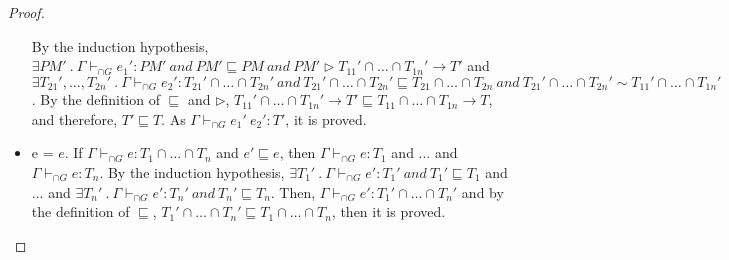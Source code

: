 \documentclass[a4paper]{article}
\begin{document}
\begin{proof}
\begin{itemize}
    By the induction hypothesis, $\exists PM'\ .\ \Gamma \vdash_{\cap G} e_1' : PM'\ and\ PM' \sqsubseteq PM\ and\ PM' \rhd T_{11}' \cap \ldots \cap T_{1n}' \rightarrow T'$ and $\exists T_{21}', \ldots, T_{2n}'\ .\ \Gamma \vdash_{\cap G} e_2' : T_{21}' \cap \ldots \cap T_{2n}'\ and\ T_{21}' \cap \ldots \cap T_{2n}' \sqsubseteq T_{21} \cap \ldots \cap T_{2n}\ and\ T_{21}' \cap \ldots \cap T_{2n}' \sim T_{11}' \cap \ldots \cap T_{1n}'$.
    By the definition of $\sqsubseteq$ and $\rhd$, $T_{11}' \cap \ldots \cap T_{1n}' \rightarrow T' \sqsubseteq T_{11} \cap \ldots \cap T_{1n} \rightarrow T$, and therefore, $T' \sqsubseteq T$.
    As $\Gamma \vdash_{\cap G} e_1'\ e_2' : T'$, it is proved.
    \item e = $e$.
    If $\Gamma \vdash_{\cap G} e : T_1 \cap \ldots \cap T_n$ and $e' \sqsubseteq e$, then $\Gamma \vdash_{\cap G} e : T_1$ and ... and $\Gamma \vdash_{\cap G} e : T_n$.
    By the induction hypothesis, $\exists T_1'\ .\ \Gamma \vdash_{\cap G} e' : T_1'\ and\ T_1' \sqsubseteq T_1$ and ... and $\exists T_n'\ .\ \Gamma \vdash_{\cap G} e' : T_n'\ and\ T_n' \sqsubseteq T_n$.
    Then, $\Gamma \vdash_{\cap G} e' : T_1' \cap \ldots \cap T_n'$ and by the definition of $\sqsubseteq$, $T_1' \cap \ldots \cap T_n' \sqsubseteq T_1 \cap \ldots \cap T_n$, then it is proved.
\end{itemize}
\end{proof}
\end{document}
